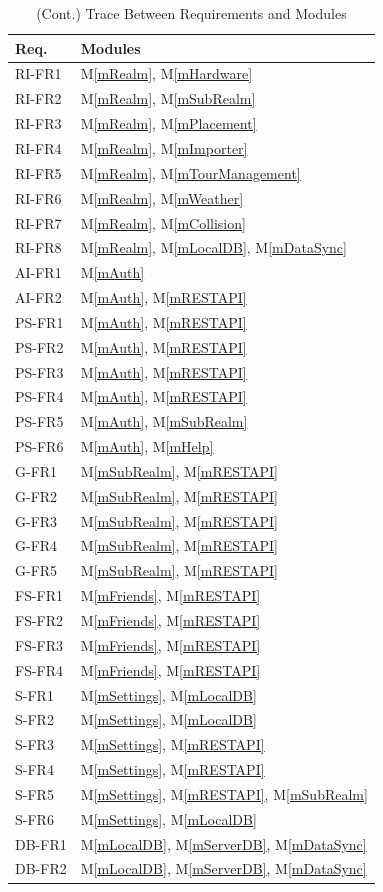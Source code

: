 \documentclass[12pt, titlepage]{article}
\newcommand{\mref}[1]{M\ref{#1}}
\begin{document}
\begin{table}[H]
\centering
\begin{tabular}{p{} p{}}
\toprule
\textbf{Req.} & \textbf{Modules}\\
\midrule
RI-FR1 & \mref{mRealm}, \mref{mHardware}\\
RI-FR2 & \mref{mRealm}, \mref{mSubRealm}\\
RI-FR3 & \mref{mRealm}, \mref{mPlacement}\\
RI-FR4 & \mref{mRealm}, \mref{mImporter}\\
RI-FR5 & \mref{mRealm}, \mref{mTourManagement}\\
RI-FR6 & \mref{mRealm}, \mref{mWeather}\\
RI-FR7 & \mref{mRealm}, \mref{mCollision}\\
RI-FR8 & \mref{mRealm}, \mref{mLocalDB}, \mref{mDataSync}\\
AI-FR1 & \mref{mAuth}\\
AI-FR2 & \mref{mAuth}, \mref{mRESTAPI}\\
PS-FR1 & \mref{mAuth}, \mref{mRESTAPI}\\
PS-FR2 & \mref{mAuth}, \mref{mRESTAPI}\\
PS-FR3 & \mref{mAuth}, \mref{mRESTAPI}\\
PS-FR4 & \mref{mAuth}, \mref{mRESTAPI}\\
PS-FR5 & \mref{mAuth}, \mref{mSubRealm}\\
PS-FR6 & \mref{mAuth}, \mref{mHelp}\\
G-FR1 & \mref{mSubRealm}, \mref{mRESTAPI}\\
G-FR2 & \mref{mSubRealm}, \mref{mRESTAPI}\\
G-FR3 & \mref{mSubRealm}, \mref{mRESTAPI}\\
G-FR4 & \mref{mSubRealm}, \mref{mRESTAPI}\\
G-FR5 & \mref{mSubRealm}, \mref{mRESTAPI}\\
FS-FR1 & \mref{mFriends}, \mref{mRESTAPI}\\
FS-FR2 & \mref{mFriends}, \mref{mRESTAPI}\\
FS-FR3 & \mref{mFriends}, \mref{mRESTAPI}\\
FS-FR4 & \mref{mFriends}, \mref{mRESTAPI}\\
S-FR1 & \mref{mSettings}, \mref{mLocalDB}\\
S-FR2 & \mref{mSettings}, \mref{mLocalDB}\\
S-FR3 & \mref{mSettings}, \mref{mRESTAPI}\\
S-FR4 & \mref{mSettings}, \mref{mRESTAPI}\\
S-FR5 & \mref{mSettings}, \mref{mRESTAPI}, \mref{mSubRealm}\\
S-FR6 & \mref{mSettings}, \mref{mLocalDB}\\
DB-FR1 & \mref{mLocalDB}, \mref{mServerDB}, \mref{mDataSync}\\
DB-FR2 & \mref{mLocalDB}, \mref{mServerDB}, \mref{mDataSync}\\
\bottomrule
\end{tabular}
\caption{(Cont.) Trace Between Requirements and Modules}
\label{TblRT}
\end{table}
\end{document}
